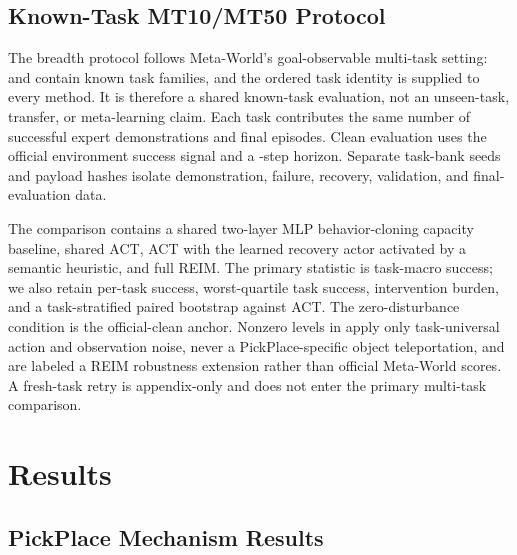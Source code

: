 \documentclass[conference]{IEEEtran}
\begin{document}
\subsection{Known-Task MT10/MT50 Protocol}

The breadth protocol follows Meta-World's goal-observable multi-task setting:
\MTTenBenchmark{} and \MTFiftyBenchmark{} contain known task families, and the
ordered task identity is supplied to every method. It is therefore a shared
known-task evaluation, not an unseen-task, transfer, or meta-learning claim.
Each task contributes the same number of successful expert demonstrations and
\MTPerTaskEvaluationEpisodes{} final episodes. Clean evaluation uses the
official environment success signal and a \MTMaxEpisodeSteps{}-step horizon.
Separate task-bank seeds and payload hashes isolate demonstration, failure,
recovery, validation, and final-evaluation data.

The comparison contains a shared two-layer MLP behavior-cloning capacity
baseline, shared ACT, ACT with the learned recovery actor activated by a
semantic heuristic, and full REIM. The primary statistic is task-macro success;
we also retain per-task success, worst-quartile task success, intervention
burden, and a task-stratified paired bootstrap against ACT. The zero-disturbance
condition is the official-clean anchor. Nonzero levels in
\MTDisturbanceLevels{} apply only task-universal action and observation noise,
never a PickPlace-specific object teleportation, and are labeled a REIM
robustness extension rather than official Meta-World scores. A fresh-task retry
is appendix-only and does not enter the primary multi-task comparison.

\section{Results}
\label{sec:results}

\subsection{PickPlace Mechanism Results}


\end{document}
